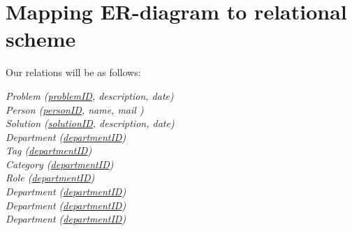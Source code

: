 \section{Mapping ER-diagram to relational scheme}
\label{sec:map_er_rel}

Our relations will be as follows:

\textit{Problem (\underline{problemID}, description, date)} \\
\textit{Person (\underline{personID}, name, mail )} \\
\textit{Solution (\underline{solutionID}, description, date)} \\
\textit{Department (\underline{departmentID})} \\
\textit{Tag (\underline{departmentID})} \\
\textit{Category (\underline{departmentID})} \\
\textit{Role (\underline{departmentID})} \\
\textit{Department (\underline{departmentID})} \\
\textit{Department (\underline{departmentID})} \\
\textit{Department (\underline{departmentID})} \\



